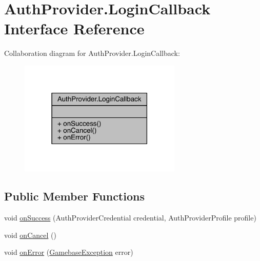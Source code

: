 \hypertarget{interfacecom_1_1toast_1_1android_1_1gamebase_1_1base_1_1auth_1_1_auth_provider_1_1_login_callback}{}\section{Auth\+Provider.\+Login\+Callback Interface Reference}
\label{interfacecom_1_1toast_1_1android_1_1gamebase_1_1base_1_1auth_1_1_auth_provider_1_1_login_callback}


Collaboration diagram for Auth\+Provider.\+Login\+Callback\+:\nopagebreak
\begin{figure}[H]
\begin{center}
\leavevmode
\includegraphics[width=219pt]{interfacecom_1_1toast_1_1android_1_1gamebase_1_1base_1_1auth_1_1_auth_provider_1_1_login_callback__coll__graph}
\end{center}
\end{figure}
\subsection*{Public Member Functions}
\begin{DoxyCompactItemize}
\item 
void \hyperlink{interfacecom_1_1toast_1_1android_1_1gamebase_1_1base_1_1auth_1_1_auth_provider_1_1_login_callback_abac10bc0cf6029386c43e665067e8fe3}{on\+Success} (Auth\+Provider\+Credential credential, Auth\+Provider\+Profile profile)
\item 
void \hyperlink{interfacecom_1_1toast_1_1android_1_1gamebase_1_1base_1_1auth_1_1_auth_provider_1_1_login_callback_a5a5a8c7638e17aa6d75298875b91a597}{on\+Cancel} ()
\item 
void \hyperlink{interfacecom_1_1toast_1_1android_1_1gamebase_1_1base_1_1auth_1_1_auth_provider_1_1_login_callback_aa7fdd9a38f0067a729ab73deef9c9003}{on\+Error} (\hyperlink{classcom_1_1toast_1_1android_1_1gamebase_1_1base_1_1_gamebase_exception}{Gamebase\+Exception} error)
\end{DoxyCompactItemize}


